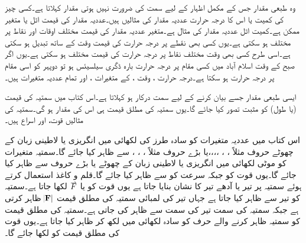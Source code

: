 وہ طبعی مقدار جس کے مکمل اظہار کے لیے سمت کی ضرورت نہیں ہوتی  مقدار کہلاتا ہے۔کسی چیز کی کمیت  یا اس کا درجہ حرارت  عددیہ مقدار کی مثالیں ہیں۔عددیہ مقدار کی قیمت اٹل یا متغیر ممکن ہے۔کمیت اٹل عددیہ مقدار کی مثال ہے۔متغیر عددیہ مقدار کی قیمت مختلف اوقات اور نقاط پر مختلف ہو سکتی ہے۔یوں کسی بھی نقطے پر درجہ حرارت کی قیمت وقت  کے ساتھ تبدیل ہو سکتی ہے۔اسی طرح کسی بھی وقت مختلف نقاط پر درجہ حرارت کی قیمت مختلف ہو سکتی ہے۔یوں اگر صبح  کے وقت اسلام آباد میں کسی مقام پر درجہ حرارت بارہ ڈگری سیلسیئس  ہو تو دوپہر کو اسی مقام پر درجہ حرارت  ہو سکتا ہے۔درجہ حرارت ، وقت ،   کے متغیرات  ،  اور  تمام عددیہ متغیرات ہیں۔

ایسی طبعی مقدار جسے بیان کرنے کے لیے سمت درکار ہو  کہلاتا ہے۔اس کتاب میں سمتیہ کی قیمت (یا طول) کو مثبت تصور کیا جائے گا۔یوں سمتیہ کی مطلق قیمت ہی اس کی مقدار ہو گی۔سمتیہ کی مثالیں قوت،   اور اسراع  ہیں۔

اس کتاب میں عددیہ متغیرات کو سادہ طرز کی لکھائی میں انگریزی یا لاطینی زبان کے  چھوٹے حروف مثلاً ، ، ،،،،   یا بڑے حروف مثلاً ، ، ،   سے ظاہر کیا جائے گا۔سمتیہ متغیرات کو موٹی لکھائی میں انگریزی یا لاطینی زبان کے  چھوٹے  یا بڑے حروف  سے ظاہر کیا جائے گا۔یوں قوت  کو  جبکہ سرعت کو  سے ظاہر کیا جائے گا۔قلم و کاغذ استعمال کرتے ہوئے سمتیہ پر تیر  یا آدھے تیر کا نشان بنایا جاتا ہے یوں قوت کو  یا  
$\overset{\rightharpoonup}{\rule{0pt}{.9ex}\smash{F}}$
لکھا جاتا ہے۔سمتیہ کو تیر سے ظاہر کیا جاتا ہے جہاں تیر کی لمبائی سمتیہ کی مطلق قیمت $\abs{\bf{F}}$  ظاہر کرتی ہے جبکہ سمتیہ کی سمت تیر کی سمت  سے ظاہر کی جاتی ہے۔سمتیہ کی مطلق قیمت کو سمتیہ ظاہر کرنے والے حرف کو سادہ لکھائی میں لکھ کر ظاہر کیا جاتا ہے۔یوں قوت   کی مطلق قیمت  کو  لکھا جائے گا۔ 


